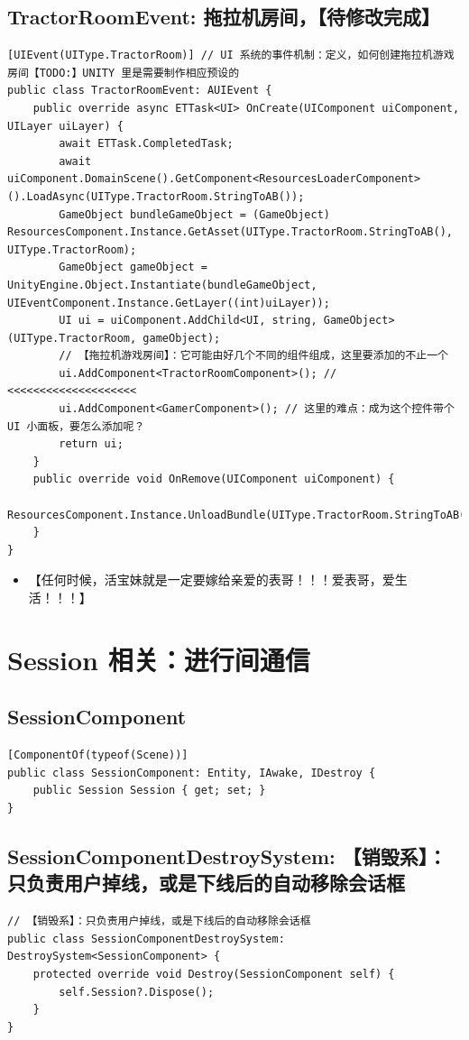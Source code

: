 \documentclass[9pt, b5paper]{article}
\begin{document}
\subsection{TractorRoomEvent: 拖拉机房间，【待修改完成】}
\label{sec-7-12}
\begin{verbatim}
[UIEvent(UIType.TractorRoom)] // UI 系统的事件机制：定义，如何创建拖拉机游戏房间【TODO:】UNITY 里是需要制作相应预设的
public class TractorRoomEvent: AUIEvent {
    public override async ETTask<UI> OnCreate(UIComponent uiComponent, UILayer uiLayer) {
        await ETTask.CompletedTask;
        await uiComponent.DomainScene().GetComponent<ResourcesLoaderComponent>().LoadAsync(UIType.TractorRoom.StringToAB());
        GameObject bundleGameObject = (GameObject) ResourcesComponent.Instance.GetAsset(UIType.TractorRoom.StringToAB(), UIType.TractorRoom);
        GameObject gameObject = UnityEngine.Object.Instantiate(bundleGameObject, UIEventComponent.Instance.GetLayer((int)uiLayer));
        UI ui = uiComponent.AddChild<UI, string, GameObject>(UIType.TractorRoom, gameObject);
        // 【拖拉机游戏房间】：它可能由好几个不同的组件组成，这里要添加的不止一个
        ui.AddComponent<TractorRoomComponent>(); // <<<<<<<<<<<<<<<<<<<< 
        ui.AddComponent<GamerComponent>(); // 这里的难点：成为这个控件带个UI 小面板，要怎么添加呢？
        return ui;
    }
    public override void OnRemove(UIComponent uiComponent) {
        ResourcesComponent.Instance.UnloadBundle(UIType.TractorRoom.StringToAB());
    }
}
\end{verbatim}
\begin{itemize}
\item 【任何时候，活宝妹就是一定要嫁给亲爱的表哥！！！爱表哥，爱生活！！！】
\end{itemize}

\section{Session 相关：进行间通信}
\label{sec-8}
\subsection{SessionComponent}
\label{sec-8-1}
\begin{verbatim}
[ComponentOf(typeof(Scene))]
public class SessionComponent: Entity, IAwake, IDestroy {
    public Session Session { get; set; }
}
\end{verbatim}
\subsection{SessionComponentDestroySystem: 【销毁系】：只负责用户掉线，或是下线后的自动移除会话框}
\label{sec-8-2}
\begin{verbatim}
// 【销毁系】：只负责用户掉线，或是下线后的自动移除会话框 
public class SessionComponentDestroySystem: DestroySystem<SessionComponent> {
    protected override void Destroy(SessionComponent self) {
        self.Session?.Dispose();
    }
}
\end{verbatim}
\end{document}

